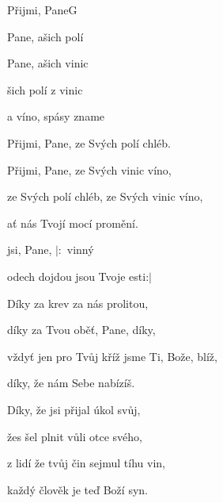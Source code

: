 \setcounter{page}{114}
\begin{song}{Přijmi, Pane}{G}{}

\begin{SBVerse}

 Pane, ašich polí  

 Pane, ašich vinic 

šich polí  z  vinic 

 a víno, spásy zname

\end{SBVerse}

\begin{SBVerse}

Přijmi, Pane, ze Svých polí chléb. 

Přijmi, Pane, ze Svých vinic víno, 

ze Svých polí chléb, ze Svých vinic víno, 

ať nás Tvojí mocí promění.

\end{SBVerse}

\begin{SBChorus}

 jsi, Pane, $|:$  vinný  

odech dojdou   jsou Tvoje esti:$|$

\end{SBChorus}

\begin{SBVerse}

Díky za krev za nás prolitou, 

díky za Tvou oběť, Pane, díky,

vždyť jen pro Tvůj kříž jsme Ti, Bože, blíž,

díky, že nám Sebe nabízíš.

\end{SBVerse}

\begin{SBVerse}

Díky, že jsi přijal úkol svůj,

žes šel plnit vůli otce svého,

z lidí že tvůj čin sejmul tíhu vin,

každý člověk je teď Boží syn.

\end{SBVerse}

\end{song}

\pagebreak
